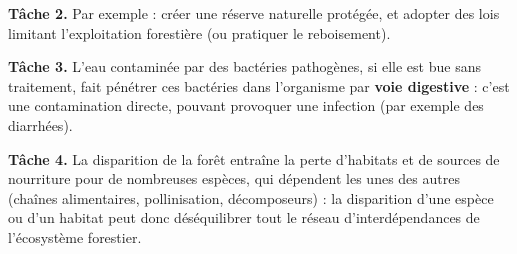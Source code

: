\textbf{Tâche 2.} Par exemple : créer une réserve naturelle protégée, et adopter des
lois limitant l'exploitation forestière (ou pratiquer le reboisement).

\textbf{Tâche 3.} L'eau contaminée par des bactéries pathogènes, si elle est bue sans
traitement, fait pénétrer ces bactéries dans l'organisme par \textbf{voie digestive}
: c'est une contamination directe, pouvant provoquer une infection (par exemple des
diarrhées).

\textbf{Tâche 4.} La disparition de la forêt entraîne la perte d'habitats et de
sources de nourriture pour de nombreuses espèces, qui dépendent les unes des autres
(chaînes alimentaires, pollinisation, décomposeurs) : la disparition d'une espèce ou
d'un habitat peut donc déséquilibrer tout le réseau d'interdépendances de
l'écosystème forestier.
